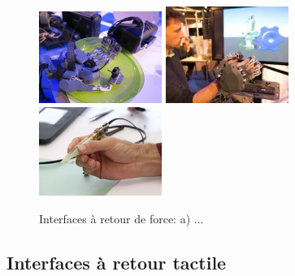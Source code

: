 \begin{figure}[!h]
	\centering
	\includegraphics[width=4cm]{1_Bible/Photos/Apparatus/cea_gant_1.jpg}\hspace{1cm}
	\includegraphics[width=4cm]{1_Bible/Photos/Apparatus/cea_gant_2.jpg}\hspace{1cm}
	\includegraphics[width=4cm]{1_Bible/Photos/Apparatus/pince_isir.jpg}
	\caption{Interfaces à retour de force: a) ... }\label{int_retourf_3}
\end{figure}

\subsection{Interfaces à retour tactile}

